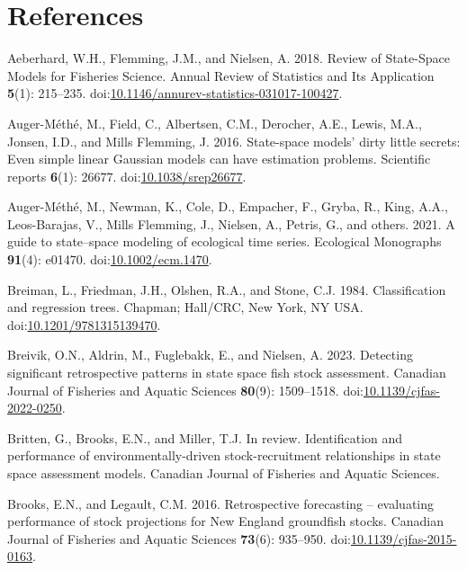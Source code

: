 \section*{References}\label{references}

\protect{}\label{refs}
\begin{CSLReferences}{1}{0}
Aeberhard, W.H., Flemming, J.M., and Nielsen, A. 2018. Review of
{State}-{Space Models} for {Fisheries Science}. Annual Review of
Statistics and Its Application \textbf{5}(1): 215--235.
doi:\href{https://doi.org/10.1146/annurev-statistics-031017-100427}{10.1146/annurev-statistics-031017-100427}.

Auger-Méthé, M., Field, C., Albertsen, C.M., Derocher, A.E., Lewis,
M.A., Jonsen, I.D., and Mills Flemming, J. 2016. State-space models'
dirty little secrets: Even simple linear {G}aussian models can have
estimation problems. Scientific reports \textbf{6}(1): 26677.
doi:\href{https://doi.org/10.1038/srep26677}{10.1038/srep26677}.

{Auger-Méthé, M., Newman, K., Cole, D., Empacher, F., Gryba, R., King,
A.A., Leos-Barajas, V., Mills Flemming, J., Nielsen, A., Petris, G., and
others}. 2021. A guide to state--space modeling of ecological time
series. Ecological Monographs \textbf{91}(4): e01470.
doi:\href{https://doi.org/10.1002/ecm.1470}{10.1002/ecm.1470}.

Breiman, L., Friedman, J.H., Olshen, R.A., and Stone, C.J. 1984.
Classification and regression trees. Chapman; Hall/CRC, New York, NY
USA.
doi:\href{https://doi.org/10.1201/9781315139470}{10.1201/9781315139470}.

Breivik, O.N., Aldrin, M., Fuglebakk, E., and Nielsen, A. 2023.
Detecting significant retrospective patterns in state space fish stock
assessment. Canadian Journal of Fisheries and Aquatic Sciences
\textbf{80}(9): 1509--1518.
doi:\href{https://doi.org/10.1139/cjfas-2022-0250}{10.1139/cjfas-2022-0250}.

Britten, G., Brooks, E.N., and Miller, T.J. In review. Identification
and performance of environmentally-driven stock-recruitment
relationships in state space assessment models. Canadian Journal of
Fisheries and Aquatic Sciences.

Brooks, E.N., and Legault, C.M. 2016. Retrospective forecasting --
evaluating performance of stock projections for {N}ew {E}ngland
groundfish stocks. Canadian Journal of Fisheries and Aquatic Sciences
\textbf{73}(6): 935--950.
doi:\href{https://doi.org/10.1139/cjfas-2015-0163}{10.1139/cjfas-2015-0163}.


\end{CSLReferences}
